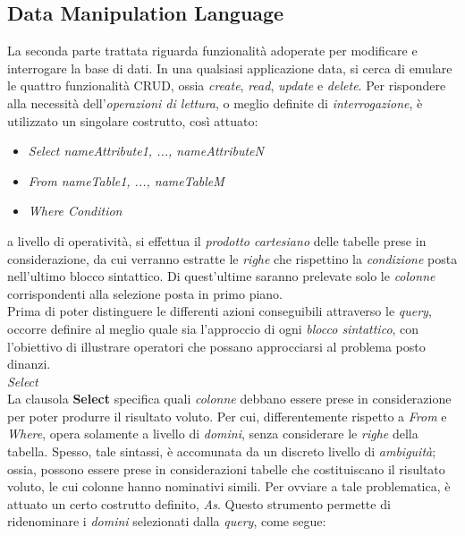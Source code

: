 \documentclass{article}
\begin{document}
\subsection*{Data Manipulation Language}
\large
La seconda parte trattata riguarda funzionalità adoperate per modificare e interrogare la base di dati. In una qualsiasi applicazione data, si cerca di emulare le quattro funzionalità CRUD, ossia \textit{create}, \textit{read}, \textit{update} e \textit{delete}. Per rispondere alla necessità dell'\textit{operazioni di lettura}, o meglio definite di \textit{interrogazione}, è utilizzato un singolare costrutto, così attuato:
\begin{itemize}[label={ }, leftmargin=1cm]
    \item \textit{Select nameAttribute1, ..., nameAttributeN}
    \item \textit{From nameTable1, ..., nameTableM}
    \item \textit{Where Condition}
\end{itemize} 
a livello di operatività, si effettua il \textit{prodotto cartesiano} delle tabelle prese in considerazione, da cui verranno estratte le \textit{righe} che rispettino la \textit{condizione} posta nell'ultimo blocco sintattico. Di quest'ultime saranno prelevate solo le \textit{colonne} corrispondenti alla selezione posta in primo piano.\vspace*{14pt}\\
Prima di poter distinguere le differenti azioni conseguibili attraverso le \textit{query}, occorre definire al meglio quale sia l'approccio di ogni \textit{blocco sintattico}, con l'obiettivo di illustrare operatori che possano approcciarsi al problema posto dinanzi.\vspace*{14pt}\\
\textit{Select}\\
La clausola \textbf{Select} specifica quali \textit{colonne} debbano essere prese in considerazione per poter produrre il risultato voluto. Per cui, differentemente rispetto a \textit{From} e \textit{Where}, opera solamente a livello di \textit{domini}, senza considerare le \textit{righe} della tabella.
Spesso, tale sintassi, è accomunata da un discreto livello di \textit{ambiguità}; ossia, possono essere prese in considerazioni tabelle che costituiscano il risultato voluto, le cui colonne hanno nominativi simili. Per ovviare a tale problematica, è attuato un certo costrutto definito, \textit{As}. Questo strumento permette di ridenominare i \textit{domini} selezionati dalla \textit{query}, come segue:
\end{document}
